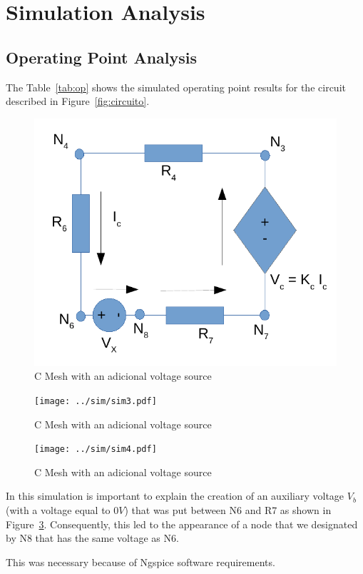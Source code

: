 \section{Simulation Analysis}
\label{sec:simulation}

\subsection{Operating Point Analysis}


The Table~\ref{tab:op} shows the simulated operating point results for the circuit described in Figure~\ref{fig:circuito}.

\begin{figure}[h] \centering
\includegraphics[width=0.6\linewidth]{malhaC.pdf}
\caption{C Mesh with an adicional voltage source} %
\label{fig:malhaC}
\end{figure}

\begin{figure}[h] \centering
\texttt{[image: ../sim/sim3.pdf]}
\caption{C Mesh with an adicional voltage source} %
\label{fig:malhaC}
\end{figure}

\begin{figure}[h] \centering
\texttt{[image: ../sim/sim4.pdf]}
\caption{C Mesh with an adicional voltage source} %
\label{fig:malhaC}
\end{figure}


In this simulation is important to explain the creation of an auxiliary voltage $V_b$ (with a voltage equal to $0V$) that was put between N6 and R7 as shown in Figure~\ref{fig:malhaC}. Consequently, this led to the appearance of a node that we designated by N8 that has the same voltage as N6.

This was necessary because of Ngspice software requirements.

